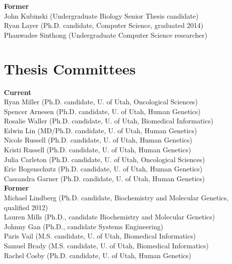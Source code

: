 \documentclass[margin,line]{cv}
\begin{document}
\begin{resume}
    \textbf{Former} \\
    John Kubinski (Undergraduate Biology Senior Thesis candidate)  \\
    Ryan Layer (Ph.D. candidate, Computer Science, graduated 2014) \\
    Phanwadee Sinthong (Undergraduate Computer Science researcher) \\



    \section{\mysidestyle Thesis Committees}
    
    \textbf{Current}\\
    Ryan Miller (Ph.D. candidate, U. of Utah, Oncological Sciences)\\
    Spencer Arnesen (Ph.D. candidate, U. of Utah, Human Genetics)\\
    Rosalie Waller (Ph.D. candidate, U. of Utah, Biomedical Informatics)\\
    Edwin Lin (MD/Ph.D. candidate, U. of Utah, Human Genetics)\\
    Nicole Russell (Ph.D. candidate, U. of Utah, Human Genetics)\\
    Kristi Russell (Ph.D. candidate, U. of Utah, Human Genetics)\\
    Julia Carleton (Ph.D. candidate, U. of Utah, Oncological Sciences)\\
    Eric Bogenschutz (Ph.D. candidate, U. of Utah, Human Genetics)\\
    Cassandra Garner (Ph.D. candidate, U. of Utah, Human Genetics)\\

    \textbf{Former} \\
    Michael Lindberg (Ph.D. candidate, Biochemistry and Molecular Genetics, qualified 2012)\\
    Lauren Mills (Ph.D., candidate Biochemistry and Molecular Genetics)\\
	Johnny Gan (Ph.D., candidate Systems Engineering) \\
    Paris Vail (M.S. candidate, U. of Utah, Biomedical Informatics) \\
    Samuel Brady (M.S. candidate, U. of Utah, Biomedical Informatics)\\
    Rachel Cosby (Ph.D. candidate, U. of Utah, Human Genetics)\\



\end{resume}
\end{document}
